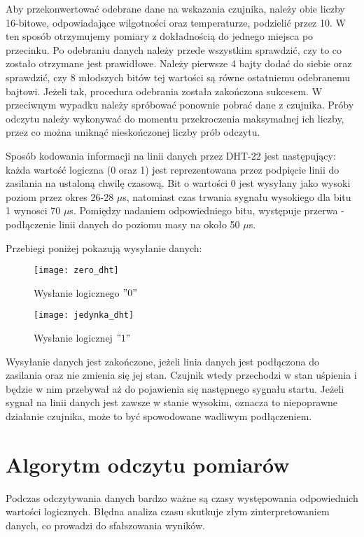 Aby przekonwertować odebrane dane na wskazania czujnika, należy obie liczby 16-bitowe, odpowiadające wilgotności oraz temperaturze, podzielić przez 10. W ten sposób otrzymujemy pomiary z dokładnością do jednego miejsca po przecinku. Po odebraniu danych należy przede wszystkim sprawdzić, czy to co zostało otrzymane jest prawidłowe. Należy pierwsze 4 bajty dodać do siebie oraz sprawdzić, czy 8 młodszych bitów tej wartości są równe ostatniemu odebranemu bajtowi. Jeżeli tak, procedura odebrania została zakończona sukcesem. W przeciwnym wypadku należy spróbować ponownie pobrać dane z czujnika. Próby odczytu należy wykonywać do momentu przekroczenia maksymalnej ich liczby, przez co można uniknąć nieskończonej liczby prób odczytu.

Sposób kodowania informacji na linii danych przez DHT-22 jest następujący: każda wartość logiczna (0 oraz 1) jest reprezentowana przez podpięcie linii do zasilania na ustaloną chwilę czasową. Bit o wartości 0 jest wysyłany jako wysoki poziom przez okres 26-28 $\mu$s, natomiast czas trwania sygnału wysokiego dla bitu 1 wynosci 70 $\mu$s. Pomiędzy nadaniem odpowiedniego bitu, występuje przerwa - podłączenie linii danych do poziomu masy na około 50 $\mu$s.

Przebiegi poniżej pokazują wysyłanie danych:
\begin{figure}[h]
\centering
\texttt{[image: zero\_dht]}
\caption{Wysłanie logicznego $"0"$}
\label{fig:zero_dht}
\end{figure}

\begin{figure}[h]
\centering
\texttt{[image: jedynka\_dht]}
\caption{Wysłanie logicznej $"1"$}
\label{fig:jedynka_dht}
\end{figure}

Wysyłanie danych jest zakończone, jeżeli linia danych jest podłączona do zasilania oraz nie zmienia się jej stan. Czujnik wtedy przechodzi w stan uśpienia i będzie w nim przebywał aż do pojawienia się następnego sygnału startu. Jeżeli sygnał na linii danych jest zawsze w stanie wysokim, oznacza to niepoprawne działanie czujnika, może to być spowodowane wadliwym podłączeniem. 

\section*{Algorytm odczytu pomiarów}
Podczas odczytywania danych bardzo ważne są czasy występowania odpowiednich wartości logicznych. Błędna analiza czasu skutkuje złym zinterpretowaniem danych, co prowadzi do sfałszowania wyników.

